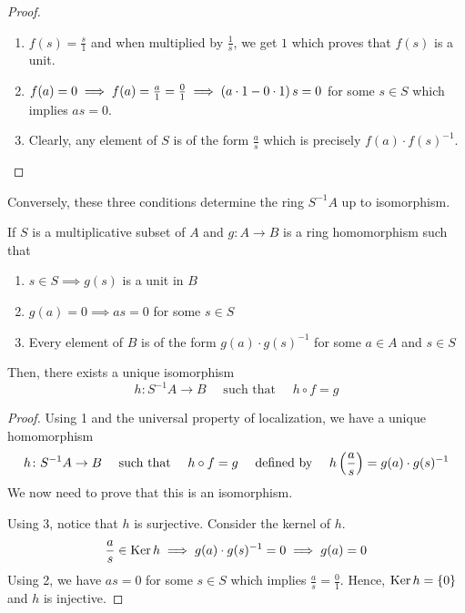 \begin{proof} \
	\begin{enumerate}
		\item \(f(s) = \frac{s}{1}\) and when multiplied by
		\(\frac{1}{s}\), we get \(1\) which proves that
		\(f(s)\) is a unit.

		\item \(f(a) = 0 \implies f(a) = \frac{a}{1} = \frac{0}{1}
		\implies \left( a \cdot 1 - 0 \cdot 1 \right) s = 0\) for some \(s \in S\)
		which implies \(as = 0\).

		\item Clearly, any element of \(S\) is of the form \(\frac{a}{s}\)
		which is precisely \(f(a) \cdot f(s)^{-1}\).
	\end{enumerate}
\end{proof}

Conversely, these three conditions determine the ring \(S^{-1} A\)
up to isomorphism.

\begin{corollary}{}{}
	If \(S\) is a multiplicative subset of \(A\) and
	\(g \colon A \to B\) is a ring homomorphism such that
	\begin{enumerate}
		\item \(s \in S \implies g(s)\) is a unit in \(B\)
		\item \(g(a) = 0 \implies as = 0\) for some \(s \in S\)
		\item Every element of \(B\) is of the form
			\(g(a) \cdot g(s)^{-1}\) for some \(a \in A\) and \(s \in S\)
	\end{enumerate}
	Then, there exists a unique isomorphism
	\[
		h \colon S^{-1}A \to B
		\quad \text{ such that } \quad
		h \circ f = g
	\]
\end{corollary}

\begin{proof}
	Using 1 and the universal property of localization, we have
	a unique homomorphism
	\[
		h \colon S^{-1}A \to B
		\quad \text{ such that } \quad
		h \circ f = g
		\quad \text{ defined by } \quad
		h\left( \frac{a}{s} \right) = g(a) \cdot g(s)^{-1}
	\]
	We now need to prove that this is an isomorphism.

	Using 3, notice that \(h\) is surjective.
	Consider the kernel of \(h\).
	\begin{align*}
		\frac{a}{s} \in \operatorname{Ker} h \implies g(a) \cdot g(s)^{-1} = 0
		\implies g(a) = 0
	\end{align*}
	Using 2, we have \(as = 0\) for some \(s \in S\)
	which implies \(\frac{a}{s} = \frac{0}{1}\).
	Hence, \(\operatorname{Ker} h = \left\{ 0 \right\}\) and \(h\) is injective.
\end{proof}


